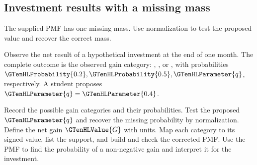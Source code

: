 \subsection{Investment results with a missing mass}
\label{subsec:t2-c1-investment-results-with-a-missing-mass}
The supplied PMF has one missing mass. Use normalization to test the proposed value and recover the correct mass.

Observe the net result of a hypothetical investment at the end of one month. The complete outcome is the observed gain category: , , or , with probabilities $\GTenHLProbability{0.2},\GTenHLProbability{0.5},\GTenHLParameter{q}$, respectively. A student proposes $\GTenHLParameter{q}=\GTenHLParameter{0.4}$.

    {Record the possible gain categories and their probabilities. Test the proposed $\GTenHLParameter{q}$ and recover the missing probability by normalization.}
    {Define the net gain $\GTenHLValue{G}$ with units. Map each category to its signed value, list the support, and build and check the corrected PMF.}
    {Use the PMF to find the probability of a non-negative gain and interpret it for the investment.}


